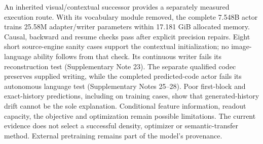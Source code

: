 An inherited visual/contextual successor provides a separately measured
execution route. With its vocabulary module removed, the complete 7.548B
actor trains 25.58M adapter/writer parameters within 17.181 GiB allocated
memory. Causal, backward and resume checks pass after explicit precision
repairs. Eight short source-engine sanity cases support the contextual
initialization; no image-language ability follows from that check. Its
continuous writer fails its reconstruction test (Supplementary Note 23).
The separate qualified codec preserves supplied writing, while the completed
predicted-code actor fails its autonomous language test
(Supplementary Notes 25--28).
Poor first-block and exact-history predictions, including on training cases,
show that generated-history drift cannot be the sole explanation.
Conditional feature information, readout capacity, the objective and
optimization remain possible limitations. The current evidence does not
select a successful density, optimizer or semantic-transfer method.
External pretraining remains part of the model's provenance.

